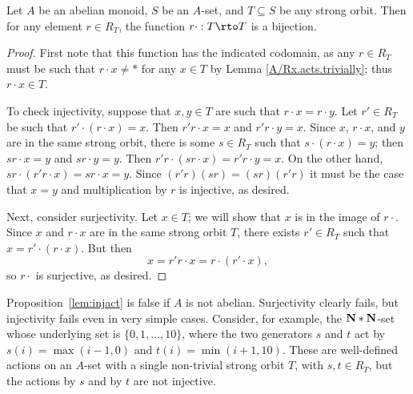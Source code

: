 \documentclass[11pt]{amsart}
\begin{document}
\begin{proposition} \label{lem:injact}
    Let $A$ be an abelian monoid, $S$ be an $A$-set, and $T\subseteq S$ be any strong orbit.  Then for any element $r\in R_T$, the function $r\cdot: T \rto T$ is a bijection.  
\end{proposition}

\begin{proof}
First note that this function has the indicated codomain, as any $r\in R_T$ must be such that $r\cdot x\neq *$ for any $x\in T$ by Lemma \ref{A/Rx.acts.trivially}; thus $r\cdot x\in T$. 

    To check injectivity, suppose that $x,y\in T$ are such that $r \cdot x = r \cdot y$.  Let $r'\in R_T$ be such that $r'\cdot (r \cdot x) = x$.  Then $r'r \cdot x = x$ and $r'r \cdot y = x$. Since $x$, $r\cdot x$, and $y$ are in the same strong orbit, there is some $s\in R_T$ such that $s\cdot (r\cdot x) = y$; then $sr \cdot x = y$ and $sr \cdot y = y$.  Then $r'r\cdot (sr \cdot x) = r'r\cdot y = x$.  On the other hand, $sr \cdot (r'r \cdot x) = sr \cdot x = y$.  Since $(r'r)(sr) = (sr)(r'r)$ it must be the case that $x =y$ and multiplication by $r$ is injective, as desired.

    Next, consider surjectivity.  Let $x\in T$; we will show that $x$ is in the image of $r\cdot$.  Since $x$ and $r\cdot x$ are in the same strong orbit $T$, there exists $r'\in R_T$ such that $x = r'\cdot (r \cdot x)$.  But then 
    \[x = r'r \cdot x = r \cdot (r'\cdot x),\]
    so $r\cdot$ is surjective, as desired.
\end{proof}

\begin{remark}
    Proposition~\ref{lem:injact} is false if $A$ is not abelian. Surjectivity clearly fails, but injectivity fails even in very simple cases.  Consider, for example, the  $\mathbf{N} * \mathbf{N}$-set whose underlying set is $\{0,1,\ldots,10\}$, where the two generators $s$ and $t$ act by $s(i) = \max(i-1,0)$ and $t(i) = \min(i+1,10)$.  These are well-defined actions on an $A$-set with a single non-trivial strong orbit $T$, with $s,t\in R_T$, but the actions by $s$ and by $t$ are not injective.
\end{remark}

\end{document}
